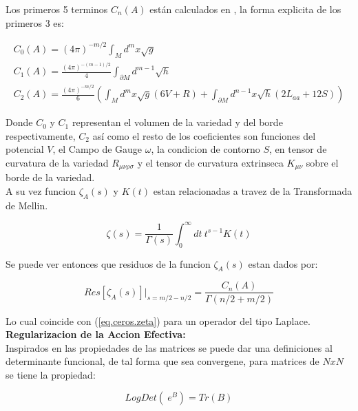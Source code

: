 Los primeros 5 terminos $C _n (A) $ están calculados en \cite{VASSILEVICH2003279}, la forma explicita de los primeros 3 es: 

\begin{equation}
\begin{array}{c}
C _0 (A) = (4 \pi ) ^{-m/2}  \int _M d ^m x \sqrt{g}  \\
C _1 (A) = \frac{(4 \pi) ^{-(m-1)/2} }{4} \int _{\partial M } d ^{m-1} \sqrt{h} \\
C _2 (A) = \frac{(4 \pi) ^{-m/2} }{6} \left(
									\int _M d ^m x\sqrt{g} (6 V + R) +
									\int _{\partial M } d ^{n-1} x 
									\sqrt{h} (2 L _{aa}  + 12 S)
									\right)
\end{array}
\end{equation} 

Donde $C _0$ y $C _1$ representan el volumen de la variedad y del borde respectivamente, $C _2$ así como el resto de los coeficientes son funciones del potencial $V$, el Campo de Gauge $\omega $, la condicion de contorno $S$, en tensor de curvatura de la variedad $R _{\mu \nu \rho \sigma }$ y el tensor de curvatura extrinseca $K _{\mu \nu }$ sobre el borde de la variedad. \\

A su vez funcion $\zeta _A (s) $ y $K(t)$ estan relacionadas a travez de la Transformada de Mellin.



\begin{equation}
\zeta (s) = \frac{1}{\Gamma (s) } 
\int _0 ^{\infty} dt \
t ^{s-1} K(t) 
\end{equation}

Se puede ver entonces que residuos de la funcion $\zeta _A (s)$ estan dados por:

\begin{equation}
Res[\zeta _A (s)] | _{s= m/2 - n/2} = \frac{C _n (A)}{\Gamma (n/2 + m/2)}
\end{equation}

Lo cual coincide con (\ref{eq.ceros.zeta}) para un operador del tipo Laplace. \\

\textbf{Regularizacion de la Accion Efectiva:} \\

Inspirados en las propiedades de las matrices se puede dar una definiciones al determinante funcional, de tal forma que sea convergene, para matrices de $ NxN$ se tiene la propiedad:

\begin{equation}
Log  Det \left( \ e ^B \right)  = Tr (B)
\end{equation}


